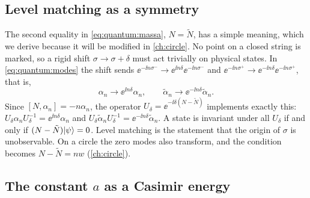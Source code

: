 \subsection{Level matching as a symmetry}\label{sec:quantum:levelmatching}

The second equality in \cref{eq:quantum:massa}, $N=\tilde N$, has a simple meaning, which
we derive because it will be modified in \cref{ch:circle}. No point on a closed string is
marked, so a rigid shift $\sigma\to\sigma+\delta$ must act trivially on physical states.
In \cref{eq:quantum:modes} the shift sends $\ee^{-\ii n\sigma^-}\to\ee^{\ii n\delta}
\ee^{-\ii n\sigma^-}$ and $\ee^{-\ii n\sigma^+}\to\ee^{-\ii n\delta}\ee^{-\ii n\sigma^+}$, that
is,
\[
 \alpha_n\to\ee^{\ii n\delta}\alpha_n,\qquad \tilde\alpha_n\to\ee^{-\ii n\delta}\tilde\alpha_n .
\]
Since $[N,\alpha_n]=-n\alpha_n$, the operator $U_\delta=\ee^{-\ii\delta(N-\tilde N)}$
implements exactly this: $U_\delta\alpha_nU_\delta^{-1}=\ee^{\ii n\delta}\alpha_n$ and
$U_\delta\tilde\alpha_nU_\delta^{-1}=\ee^{-\ii n\delta}\tilde\alpha_n$. A state is invariant
under all $U_\delta$ if and only if $(N-\tilde N)|\psi\rangle=0$. Level matching is the
statement that the origin of $\sigma$ is unobservable. On a circle the zero modes also
transform, and the condition becomes $N-\tilde N=nw$ (\cref{ch:circle}).

\subsection{The constant \texorpdfstring{$a$}{a} as a Casimir energy}

